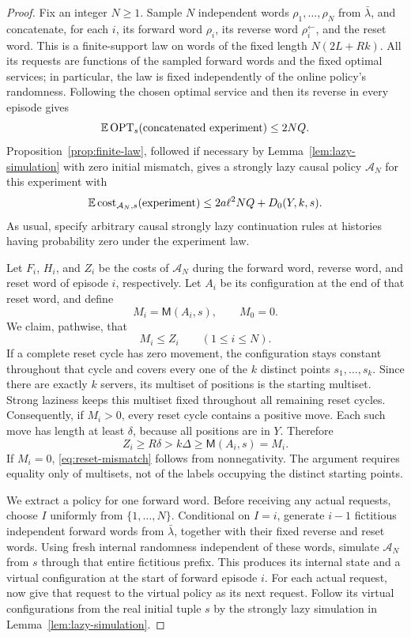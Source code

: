 \begin{proof}
Fix an integer $N\ge1$.  Sample $N$ independent words
$\rho_1,\ldots,\rho_N$ from $\bar\lambda$, and concatenate, for each
$i$, its forward word $\rho_i$, its reverse word
$\rho_i^{\leftarrow}$, and the reset word.  This is a finite-support
law on words of the fixed length $N(2L+Rk)$.  All its requests are
functions of the sampled forward words and the fixed optimal services;
in particular, the law is fixed independently of the online policy's
randomness.  Following the chosen optimal service and then its reverse
in every episode gives
\begin{equation}
 \mathbb E\operatorname{OPT}_s(\text{concatenated experiment})\le 2NQ.
 \label{eq:episode-comparator}
\end{equation}
Proposition~\ref{prop:finite-law}, followed if necessary by
Lemma~\ref{lem:lazy-simulation} with zero initial mismatch, gives a
strongly lazy causal policy $\mathcal A_N$ for this experiment with
\begin{equation}
 \mathbb E\operatorname{cost}_{\mathcal A_N,s}(\text{experiment})
       \le 2a\ell^2NQ+D_0(Y,k,s).
 \label{eq:episode-total}
\end{equation}
As usual, specify arbitrary causal strongly lazy continuation rules at
histories having probability zero under the experiment law.

Let $F_i$, $H_i$, and $Z_i$ be the costs of $\mathcal A_N$ during the
forward word, reverse word, and reset word of episode $i$,
respectively.  Let $A_i$ be its configuration at the end of that reset
word, and define
\[
 M_i=\mathsf M(A_i,s),\qquad M_0=0.
\]
We claim, pathwise, that
\begin{equation}
 M_i\le Z_i\qquad(1\le i\le N).
 \label{eq:reset-mismatch}
\end{equation}
If a complete reset cycle has zero movement, the configuration stays
constant throughout that cycle and covers every one of the $k$
distinct points $s_1,\ldots,s_k$.  Since there are exactly $k$ servers,
its multiset of positions is the starting multiset.  Strong laziness
keeps this multiset fixed throughout all remaining reset cycles.
Consequently, if $M_i>0$, every reset cycle contains a positive move.
Each such move has length at least $\delta$, because all positions
are in $Y$.  Therefore
\[
 Z_i\ge R\delta>k\Delta\ge\mathsf M(A_i,s)=M_i.
\]
If $M_i=0$, \eqref{eq:reset-mismatch} follows from nonnegativity.
The argument requires equality only of multisets, not of the labels
occupying the distinct starting points.

We extract a policy for one forward word.  Before receiving any actual
requests, choose $I$ uniformly from $\{1,\ldots,N\}$.  Conditional on
$I=i$, generate $i-1$ fictitious independent forward words from
$\bar\lambda$, together with their fixed reverse and reset words.
Using fresh internal randomness independent of these words, simulate
$\mathcal A_N$ from $s$ through that entire fictitious prefix.  This
produces its internal state and a virtual configuration at the start
of forward episode $i$.  For each actual request, now give that
request to the virtual policy as its next request.  Follow its virtual
configurations from the real initial tuple $s$ by the strongly lazy
simulation in Lemma~\ref{lem:lazy-simulation}.


\end{proof}

